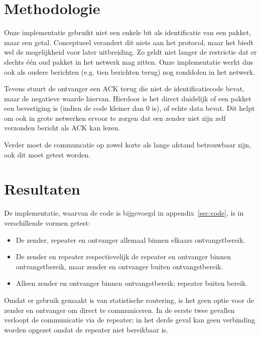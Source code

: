 \documentclass[a4paper,10pt]{article}
\begin{document}
\section{Methodologie}
Onze implementatie gebruikt niet een enkele bit als identificatie van een pakket, maar een getal. Conceptueel verandert dit niets aan het protocol, maar het biedt wel de mogelijkheid voor later uitbreiding. Zo geldt niet langer de restrictie dat er slechts \'e\'en oud pakket in het netwerk mag zitten. Onze implementatie werkt dus ook als oudere berichten (e.g. tien berichten terug) nog ronddolen in het netwerk.

Tevens stuurt de ontvanger een ACK terug die niet de identificatiecode bevat, maar de negatieve waarde hiervan. Hierdoor is het direct duidelijk of een pakket een bevestiging is (indien de code kleiner dan 0 is), of echte data bevat. Dit helpt om ook in grote netwerken ervoor te zorgen dat een zender niet zijn zelf verzonden bericht als ACK kan lezen.

Verder moet de communcatie op zowel korte als lange afstand betrouwbaar zijn, ook dit moet getest worden.

\section{Resultaten}
De implementatie, waarvan de code is bijgevoegd in appendix~\ref{sec:code}, is in verschillende vormen getest:
\begin{itemize}
	\item De zender, repeater en ontvanger allemaal binnen elkaars ontvangstbereik.
	\item De zender en repeater respectievelijk de repeater en ontvanger binnen ontvangstbereik, maar zender en ontvanger buiten ontvangstbereik.
	\item Alleen zender en ontvanger binnen ontvangstbereik; repeater buiten bereik.
\end{itemize}
Omdat er gebruik gemaakt is van statistische routering, is het geen optie voor de zender en ontvanger om direct te communiceren. In de eerste twee gevallen verloopt de communicatie via de repeater; in het derde geval kan geen verbinding worden opgezet omdat de repeater niet bereikbaar is.
\end{document}
